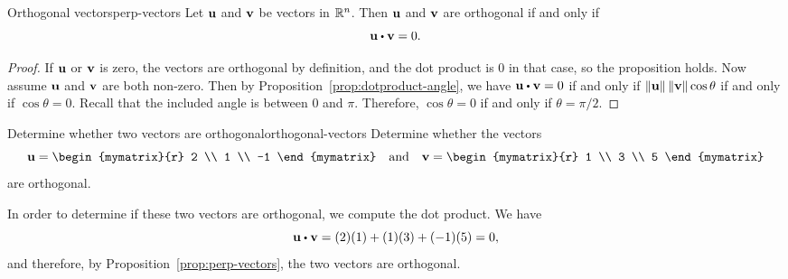 \begin{proposition}{Orthogonal vectors}{perp-vectors}
  Let $\mbox{\bf u}$ and $\mbox{\bf v}$ be vectors in $\mathbb{R}^n$. Then $\mbox{\bf u}$
  and $\mbox{\bf v}$ are orthogonal if and only
  if
  \begin{equation*}
    \vect{u} \dotprod \vect{v} = 0.
  \end{equation*}
\end{proposition}

\begin{proof}
  If $\mbox{\bf u}$ or $\mbox{\bf v}$ is zero, the vectors are orthogonal by
  definition, and the dot product is $0$ in that case, so the
  proposition holds. Now assume $\mbox{\bf u}$ and $\mbox{\bf v}$ are both
  non-zero.  Then by Proposition~\ref{prop:dotproduct-angle}, we have
  $\vect{u} \dotprod \vect{v} = 0$ if and only if
  $\left\|\mbox{\bf u}\right\| \left\|\mbox{\bf v}\right\| \cos \theta$ if and only if
  $\cos\theta=0$. Recall that the included angle is between $0$ and
  $\pi$. Therefore, $\cos\theta=0$ if and only if $\theta=\pi/2$.
\end{proof}

\begin{example}{Determine whether two vectors are orthogonal}{orthogonal-vectors}
Determine whether the vectors
\begin{equation*}
\vect{u}=
\begin{mymatrix}{r}
2 \\
1 \\
-1
\end{mymatrix}
\quad\mbox{and}\quad
\vect{v}
=
\begin{mymatrix}{r}
1 \\
3 \\
5
\end{mymatrix}
\end{equation*}
are orthogonal.
\end{example}

\begin{solution}
  In order to determine if these two vectors are orthogonal, we
  compute the dot product. We have
  \begin{equation*}
    \vect{u} \dotprod \vect{v}
    =
    (2)(1) + (1)(3) + (-1)(5)
    =
    0,
  \end{equation*}
  and therefore, by Proposition~\ref{prop:perp-vectors}, the two vectors are orthogonal.
\end{solution}

